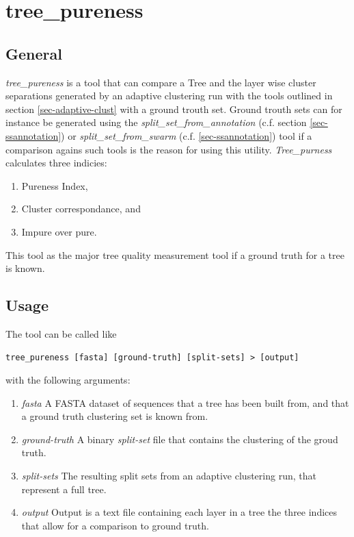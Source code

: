 \section{tree\_pureness} \label{sec-pureness}

\subsection{General}

\emph{tree\_pureness} is a tool that can compare a Tree and the layer wise
cluster separations generated by an adaptive clustering run with the tools
outlined in section \ref{sec-adaptive-clust} with a ground trouth set.
Ground trouth sets can for instance be generated using the
\emph{split\_set\_from\_annotation} (c.f. section
\ref{sec-ssannotation}) or \emph{split\_set\_from\_swarm}
(c.f. \ref{sec-ssannotation})
tool if a comparison agains such tools is the reason for using this
utility. \emph{Tree\_purness} calculates three indicies:
\begin{enumerate}
\item Pureness Index,
\item Cluster correspondance,
  and
\item Impure over pure.
\end{enumerate}
This tool as the major tree quality measurement tool if a ground truth
for a tree is known. 

\subsection{Usage}
The tool can be called like
\begin{lstlisting}
tree_pureness [fasta] [ground-truth] [split-sets] > [output]
\end{lstlisting}
with the following arguments:
\begin{enumerate}
\item \emph{fasta} A FASTA dataset of sequences that a tree has been
  built from, and that a ground truth clustering set is known from.
\item \emph{ground-truth} A binary \emph{split-set} file that contains
  the clustering of the groud truth.
\item \emph{split-sets} The resulting split sets from an adaptive
  clustering run, that represent a full tree.
\item \emph{output} Output is a text file containing each layer in a
  tree the three indices that allow for a comparison to ground truth.
\end{enumerate}

